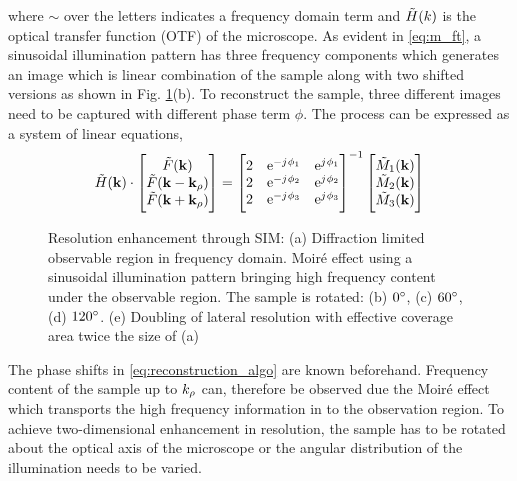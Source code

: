 \documentclass[11pt]{article}
\begin{document}
where $\sim$ over the letters indicates a frequency domain term and $\tilde{H}(k)$ is the optical transfer function (OTF) of the microscope. As evident in \eqref{eq:m_ft}, a sinusoidal illumination pattern has three frequency components which generates an image which is linear combination of the sample along with two shifted versions as shown in Fig. \ref{fig:sim}(b). To reconstruct the sample, three different images need to be captured with different phase term $\phi$. The process can be expressed as a system of linear equations,
%
\begin{equation}
  \tilde{H}(\mathbf{k}) \cdot
  \begin{bmatrix}
    \tilde{F}(\mathbf{k}) \\
    \tilde{F}(\mathbf{k} - \mathbf{k}_{\rho}) \\
    \tilde{F}(\mathbf{k} + \mathbf{k}_{\rho})
  \end{bmatrix}
  =
  \begin{bmatrix}
    2 & \mathrm{e}^{-j\mkern1mu \phi_1} & \mathrm{e}^{j\mkern1mu \phi_1} \\
    2 & \mathrm{e}^{-j\mkern1mu \phi_2} & \mathrm{e}^{j\mkern1mu \phi_2} \\
    2 & \mathrm{e}^{-j\mkern1mu \phi_3} & \mathrm{e}^{j\mkern1mu \phi_3} \\
  \end{bmatrix}^{-1}
  \begin{bmatrix}
   \tilde{M}_1(\mathbf{k}) \\
   \tilde{M}_2(\mathbf{k}) \\
   \tilde{M}_3(\mathbf{k})
  \end{bmatrix}
  \label{eq:reconstruction_algo}
\end{equation}
%
\begin{figure}[t!]
  \centering
  \def\svgwidth{.75\linewidth}
  
  \caption{Resolution enhancement through SIM: (a) Diffraction limited observable region in frequency domain.  Moiré effect using a sinusoidal illumination pattern bringing high frequency content under the observable region. The sample is rotated: (b) $0 \degree$, (c) $60 \degree$, (d) $120 \degree$. (e) Doubling of lateral resolution with effective coverage area twice the size of (a)}
  \label{fig:sim}
\end{figure}
%
The phase shifts in \eqref{eq:reconstruction_algo} are known beforehand. Frequency content of the sample up to $k_{\rho}$ can, therefore be observed due the Moiré effect which transports the high frequency information in to the observation region. To achieve two-dimensional enhancement in resolution, the sample has to be rotated about the optical axis of the microscope or the angular distribution of the illumination needs to be varied.
\end{document}
